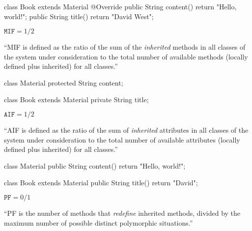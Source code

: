 \documentclass{article}
\begin{document}
\begin{multicols}{2}
{\small\begin{ffcode}
class Book extends Material {
  @Override
  public String content() {
    return "Hello, world!";
  }
  public String title() {
    return "David West";
  }
}
\end{ffcode}
}
\par\columnbreak\par
\(\texttt{MIF} = 1/2\)\par
``MIF is defined as the ratio of the sum of the \emph{inherited} methods in all classes of
the system under consideration to the total number of available methods
(locally defined plus inherited) for all classes.''
\end{multicols}
\plush{}

\begin{multicols}{2}
{\small\begin{ffcode}
class Material {
  protected String content;
}

class Book extends Material {
  private String title;
}
\end{ffcode}
}
\par\columnbreak\par
\(\texttt{AIF} = 1/2\)\par
``AIF is defined as the ratio of the sum of \emph{inherited} attributes in all classes of
the system under consideration to the total number of available attributes
(locally defined plus inherited) for all classes.''
\end{multicols}
\plush{}

\begin{multicols}{2}
{\small\begin{ffcode}
class Material {
  public String content() {
    return "Hello, world!";
  }
}

class Book extends Material {
  public String title() {
    return "David";
  }
}
\end{ffcode}
}
\par\columnbreak\par
\(\texttt{PF} = 0/1\)\par
``PF is the number of methods that \emph{redefine} inherited methods, divided by the
maximum number of possible distinct polymorphic situations.''
\end{multicols}
\plush{}

\end{document}
